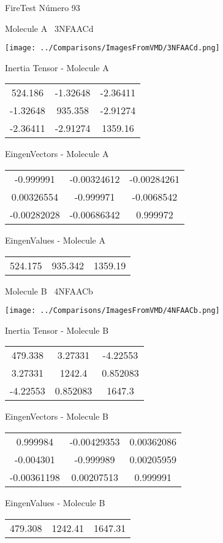 \vtab[-3cm]
\begin{center}
{\large FireTest \tab Número 93}
\end{center}
\begin{multicols}{2}
\begin{center}

Molecule A \
3NFAACd

\texttt{[image: ../Comparisons/ImagesFromVMD/3NFAACd.png]}

Inertia Tensor - Molecule A \\
\begin{tabular}{|c c c|}
524.186	 & 	-1.32648	 & 	-2.36411	 \\
-1.32648	 & 	935.358	 & 	-2.91274	 \\
-2.36411	 & 	-2.91274	 & 	1359.16
\end{tabular}

\vtab
 EingenVectors - Molecule A     \\
\begin{tabular}{|c c c|}
-0.999991	 & 	-0.00324612	 & 	-0.00284261	 \\
0.00326554	 & 	-0.999971	 & 	-0.0068542	 \\
-0.00282028	 & 	-0.00686342	 & 	0.999972
\end{tabular}

\vtab
 EingenValues - Molecule A     \\
\begin{tabular}{|c c c|}
524.175	 & 	935.342	 & 	1359.19	 \\
\end{tabular}
\columnbreak

Molecule B \
4NFAACb

\texttt{[image: ../Comparisons/ImagesFromVMD/4NFAACb.png]}

Inertia Tensor - Molecule B \\
\begin{tabular}{|c c c|}
479.338	 & 	3.27331	 & 	-4.22553	 \\
3.27331	 & 	1242.4	 & 	0.852083	 \\
-4.22553	 & 	0.852083	 & 	1647.3
\end{tabular}

\vtab
 EingenVectors - Molecule B     \\
\begin{tabular}{|c c c|}
0.999984	 & 	-0.00429353	 & 	0.00362086	 \\
-0.004301	 & 	-0.999989	 & 	0.00205959	 \\
-0.00361198	 & 	0.00207513	 & 	0.999991
\end{tabular}

\vtab
 EingenValues - Molecule B     \\
\begin{tabular}{|c c c|}
479.308	 & 	1242.41	 & 	1647.31	 \\
\end{tabular}

\end{center}
\end{multicols}

